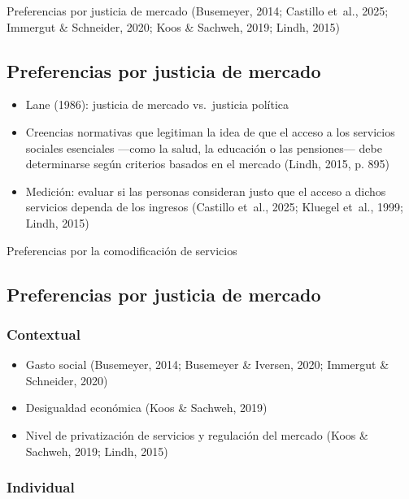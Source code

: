 \documentclass[
  spanish,
  letterpaper,
  DIV=11,
  numbers=noendperiod,
  oneside]{scrartcl}
\providecommand{\tightlist}{%
  \setlength{\itemsep}{0pt}\setlength{\parskip}{0pt}}
\begin{document}
Preferencias por justicia de mercado (Busemeyer, 2014; Castillo et~al.,
2025; Immergut \& Schneider, 2020; Koos \& Sachweh, 2019; Lindh, 2015)

\subsection{Preferencias por justicia de
mercado}\label{preferencias-por-justicia-de-mercado}

\begin{itemize}
\item
  Lane (1986): justicia de mercado vs.~justicia política
\item
  Creencias normativas que legitiman la idea de que el acceso a los
  servicios sociales esenciales ---como la salud, la educación o las
  pensiones--- debe determinarse según criterios basados en el mercado
  (Lindh, 2015, p. 895)
\item
  Medición: evaluar si las personas consideran justo que el acceso a
  dichos servicios dependa de los ingresos (Castillo et~al., 2025;
  Kluegel et~al., 1999; Lindh, 2015)
\end{itemize}

Preferencias por la comodificación de servicios

\subsection{Preferencias por justicia de
mercado}\label{preferencias-por-justicia-de-mercado-1}

\subsubsection{Contextual}\label{contextual}

\begin{itemize}
\tightlist
\item
  Gasto social (Busemeyer, 2014; Busemeyer \& Iversen, 2020; Immergut \&
  Schneider, 2020)
\item
  Desigualdad económica (Koos \& Sachweh, 2019)
\item
  Nivel de privatización de servicios y regulación del mercado (Koos \&
  Sachweh, 2019; Lindh, 2015)
\end{itemize}

\subsubsection{Individual}\label{individual}
\end{document}
